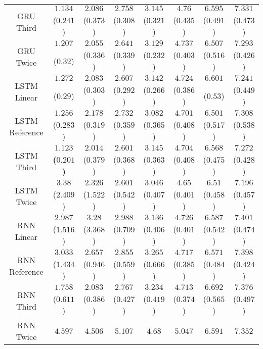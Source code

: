 \begin{table}[!ht]
{\begin{tabular}{|c|c|c|c|c|c|c|c|}
			\multirow{2}{*}{GRU Third} & $1.134$ & $2.086$ & $2.758$ & $3.145$ & $4.76$ & $6.595$ & $7.331$ \\
			 & ($0.241$) & ($0.373$) & ($0.308$) & ($0.321$) & ($0.435$) & ($0.491$) & ($0.473$) \\ \hline
			\multirow{2}{*}{GRU Twice} & $1.207$ & $2.055$ & $2.641$ & $3.129$ & $4.737$ & $6.507$ & $7.293$ \\
			 & ($0.32$) & ($0.336$) & ($0.339$) & ($0.232$) & ($0.403$) & ($0.516$) & ($0.426$) \\ \hline
			\multirow{2}{*}{LSTM Linear} & $1.272$ & $2.083$ & $2.607$ & $3.142$ & $4.724$ & $6.601$ & $7.241$ \\
			 & ($0.29$) & ($0.303$) & ($0.292$) & ($0.266$) & ($0.386$) & ($0.53$) & ($0.449$) \\ \hline
			\multirow{2}{*}{LSTM Reference} & $1.256$ & $2.178$ & $2.732$ & $3.082$ & $4.701$ & $6.501$ & $7.308$ \\
			 & ($0.283$) & ($0.319$) & ($0.359$) & ($0.365$) & ($0.408$) & ($0.517$) & ($0.538$) \\ \hline
			\multirow{2}{*}{LSTM Third} & $\mathbf{1.123}$ & $2.014$ & $2.601$ & $3.145$ & $4.704$ & $6.568$ & $7.272$ \\
			 & \textbf{(}$\mathbf{0.201}$\textbf{)} & ($0.379$) & ($0.368$) & ($0.363$) & ($0.408$) & ($0.475$) & ($0.428$) \\ \hline
			\multirow{2}{*}{LSTM Twice} & $3.38$ & $2.326$ & $2.601$ & $3.046$ & $4.65$ & $6.51$ & $7.196$ \\
			 & ($2.409$) & ($1.522$) & ($0.542$) & ($0.407$) & ($0.401$) & ($0.458$) & ($0.457$) \\ \hline
			\multirow{2}{*}{RNN Linear} & $2.987$ & $3.28$ & $2.988$ & $3.136$ & $4.726$ & $6.587$ & $7.401$ \\
			 & ($1.516$) & ($3.368$) & ($0.709$) & ($0.406$) & ($0.401$) & ($0.542$) & ($0.474$) \\ \hline
			\multirow{2}{*}{RNN Reference} & $3.033$ & $2.657$ & $2.855$ & $3.265$ & $4.717$ & $6.571$ & $7.398$ \\
			 & ($1.434$) & ($0.946$) & ($0.559$) & ($0.666$) & ($0.385$) & ($0.484$) & ($0.424$) \\ \hline
			\multirow{2}{*}{RNN Third} & $1.758$ & $2.083$ & $2.767$ & $3.234$ & $4.713$ & $6.692$ & $7.376$ \\
			 & ($0.611$) & ($0.386$) & ($0.427$) & ($0.419$) & ($0.374$) & ($0.565$) & ($0.497$) \\ \hline
			\multirow{2}{*}{RNN Twice} & $4.597$ & $4.506$ & $5.107$ & $4.68$ & $5.047$ & $6.591$ & $7.352$ \\

\end{tabular}}
\end{table}
